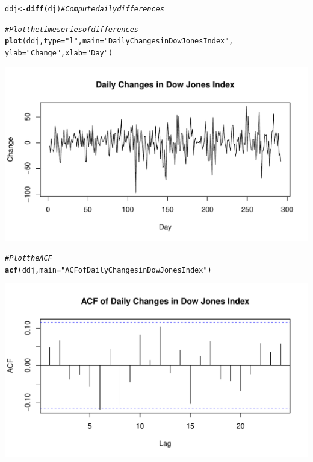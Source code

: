 \documentclass[12pt]{article}\usepackage[]{graphicx}\usepackage[]{xcolor}
\makeatletter
\def\maxwidth{ %
  \ifdim\Gin@nat@width>\linewidth
    \linewidth
  \else
    \Gin@nat@width
  \fi
}
\newcommand{\hlsng}[1]{\textcolor[rgb]{0.192,0.494,0.8}{#1}}%
\newcommand{\hlcom}[1]{\textcolor[rgb]{0.678,0.584,0.686}{\textit{#1}}}%
\newcommand{\hldef}[1]{\textcolor[rgb]{0.345,0.345,0.345}{#1}}%
\newcommand{\hlkwb}[1]{\textcolor[rgb]{0.69,0.353,0.396}{#1}}%
\newcommand{\hlkwc}[1]{\textcolor[rgb]{0.333,0.667,0.333}{#1}}%
\newcommand{\hlkwd}[1]{\textcolor[rgb]{0.737,0.353,0.396}{\textbf{#1}}}%
\newenvironment{kframe}{%
 \def\at@end@of@kframe{}%
 \ifinner\ifhmode%
  \def\at@end@of@kframe{\end{minipage}}%
  \begin{minipage}{\columnwidth}%
 \fi\fi%
 \def\FrameCommand##1{\hskip\@totalleftmargin \hskip-\fboxsep
 \colorbox{shadecolor}{##1}\hskip-\fboxsep
     \hskip-\linewidth \hskip-\@totalleftmargin \hskip\columnwidth}%
 \MakeFramed {\advance\hsize-\width
   \@totalleftmargin\z@ \linewidth\hsize
   \@setminipage}}%
 {\par\unskip\endMakeFramed%
 \at@end@of@kframe}
\newenvironment{knitrout}{}{} %
\makeatother
\begin{document}
\begin{knitrout}
\color{fgcolor}\begin{kframe}
\begin{alltt}
\hldef{ddj} \hlkwb{<-} \hlkwd{diff}\hldef{(dj)}  \hlcom{# Compute daily differences}

\hlcom{# Plot the time series of differences}
\hlkwd{plot}\hldef{(ddj,} \hlkwc{type} \hldef{=} \hlsng{"l"}\hldef{,} \hlkwc{main} \hldef{=} \hlsng{"Daily Changes in Dow Jones Index"}\hldef{,}
    \hlkwc{ylab} \hldef{=} \hlsng{"Change"}\hldef{,} \hlkwc{xlab} \hldef{=} \hlsng{"Day"}\hldef{)}
\end{alltt}
\end{kframe}

{\centering \includegraphics[width=\maxwidth]{figure/unnamed-chunk-7-1} 

}


\begin{kframe}\begin{alltt}
\hlcom{# Plot the ACF}
\hlkwd{acf}\hldef{(ddj,} \hlkwc{main} \hldef{=} \hlsng{"ACF of Daily Changes in Dow Jones Index"}\hldef{)}
\end{alltt}
\end{kframe}

{\centering \includegraphics[width=\maxwidth]{figure/unnamed-chunk-7-2} 

}


\end{knitrout}
\end{document}
